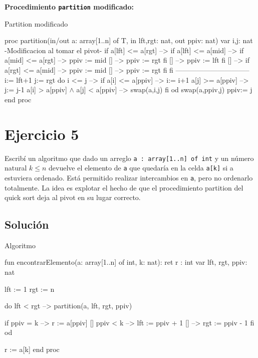 \textbf{Procedimiento \texttt{partition} modificado:}

\begin{codebox}{Partition modificado}
\begin{pascallike}
proc partition(in/out a: array[1..n] of T, in lft,rgt: nat, out ppiv: nat)
    var i,j: nat
    {-Modificacion al tomar el pivot-}
    if a[lft] <= a[rgt] -->
    if a[lft] <= a[mid] -->
        if a[mid] <= a[rgt] -->
        ppiv := mid
        [] -->
        ppiv := rgt
        fi
        [] -->
        ppiv := lft
        fi
    [] -->
    if a[rgt] <= a[mid] -->
        ppiv := mid
    [] -->
        ppiv := rgt
    fi
    fi
    {--------------------------------}
    i:= lft+1
    j:= rgt
    do i <= j --> if a[i] <= a[ppiv] --> i:= i+1
                    a[j] >= a[ppiv] --> j:= j-1
                    a[i] > a[ppiv] $\wedge$ a[j] < a[ppiv] --> swap(a,i,j)
                fi
    od
    swap(a,ppiv,j)
    ppiv:= j
end proc
\end{pascallike}
\end{codebox}

\section{Ejercicio 5}
Escribí un algoritmo que dado un arreglo \texttt{a : array[1..n] of int} y un número natural $k \leq n$ devuelve el elemento de \texttt{a} que quedaría en la celda \texttt{a[k]} si a estuviera ordenado. Está permitido realizar intercambios en \texttt{a}, pero no ordenarlo totalmente. La idea es explotar el hecho de que el procedimiento partition del quick sort deja al pivot en su lugar correcto.

\subsection{Solución}

\begin{codebox}{Algoritmo}
\begin{pascallike}
fun encontrarElemento(a: array[1..n] of int, k: nat): ret r : int
    var lft, rgt, ppiv: nat

    lft := 1
    rgt := n

    do lft < rgt -->
        partition(a, lft, rgt, ppiv)

        if ppiv = k -->
            r := a[ppiv]
        [] ppiv < k -->
            lft := ppiv + 1
        [] -->
            rgt := ppiv - 1
        fi
    od

    r := a[k]
end proc
\end{pascallike}
\end{codebox}

